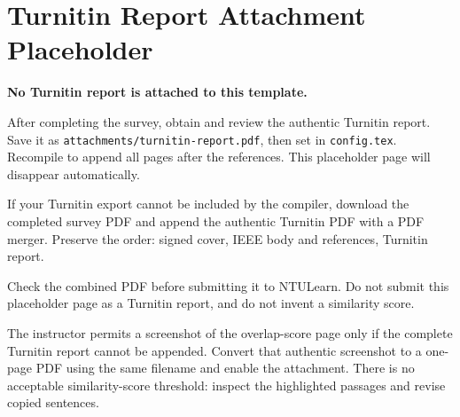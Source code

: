\thispagestyle{plain}
\raggedright
\section*{Turnitin Report Attachment Placeholder}
\noindent\textbf{No Turnitin report is attached to this template.}
\vspace{0.4cm}

\noindent After completing the survey, obtain and review the authentic Turnitin report. Save it as \texttt{attachments/turnitin-report.pdf}, then set \texttt{\string\AttachTurnitintrue} in \texttt{config.tex}. Recompile to append all pages after the references. This placeholder page will disappear automatically.

\vspace{0.4cm}
\noindent If your Turnitin export cannot be included by the compiler, download the completed survey PDF and append the authentic Turnitin PDF with a PDF merger. Preserve the order: signed cover, IEEE body and references, Turnitin report.

\vspace{0.4cm}
\noindent Check the combined PDF before submitting it to NTULearn. Do not submit this placeholder page as a Turnitin report, and do not invent a similarity score.


\vspace{0.4cm}
\noindent The instructor permits a screenshot of the overlap-score page only if the complete Turnitin report cannot be appended. Convert that authentic screenshot to a one-page PDF using the same filename and enable the attachment. There is no acceptable similarity-score threshold: inspect the highlighted passages and revise copied sentences.
